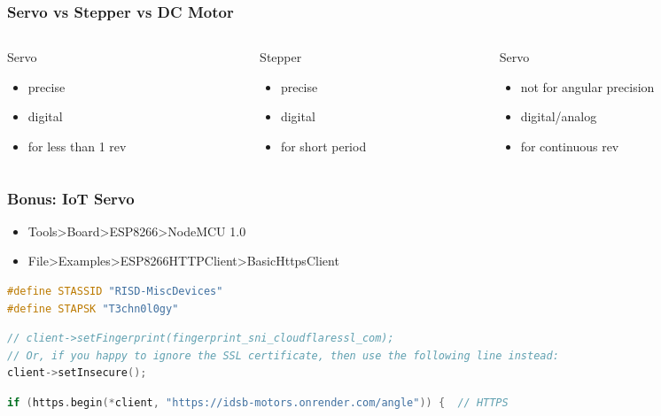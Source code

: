 \documentclass[compress, aspectratio=32]{beamer}
\begin{document}
\begin{frame}
    \frametitle{Servo vs Stepper vs DC Motor}
    \begin{columns}
        \begin{column}[]{0.3\textwidth}
            Servo
            \begin{itemize}
                \item precise
                \item digital
                \item for less than 1 rev
            \end{itemize}
        \end{column}
        \begin{column}[]{0.3\textwidth}
            Stepper
            \begin{itemize}
                \item precise
                \item digital
                \item for short period
            \end{itemize}
        \end{column}
        \begin{column}[]{0.3\textwidth}
            Servo
            \begin{itemize}
                \item not for angular precision
                \item digital/analog
                \item for continuous rev
            \end{itemize}
        \end{column}
    \end{columns}
\end{frame}

\begin{frame}[fragile]
    \frametitle{Bonus: IoT Servo}
    \begin{itemize}
        \item Tools>Board>ESP8266>NodeMCU 1.0
        \item File>Examples>ESP8266HTTPClient>BasicHttpsClient
    \end{itemize}
    \begin{lstlisting}[language=c, firstnumber=19]
#define STASSID "RISD-MiscDevices"
#define STAPSK "T3chn0l0gy"
    \end{lstlisting}
    
    \begin{lstlisting}[language=c, firstnumber=48]
// client->setFingerprint(fingerprint_sni_cloudflaressl_com);
// Or, if you happy to ignore the SSL certificate, then use the following line instead:
client->setInsecure();
    \end{lstlisting}
    \begin{lstlisting}[language=c, firstnumber=55] 
    if (https.begin(*client, "https://idsb-motors.onrender.com/angle")) {  // HTTPS
    \end{lstlisting}

\end{frame}
\end{document}
